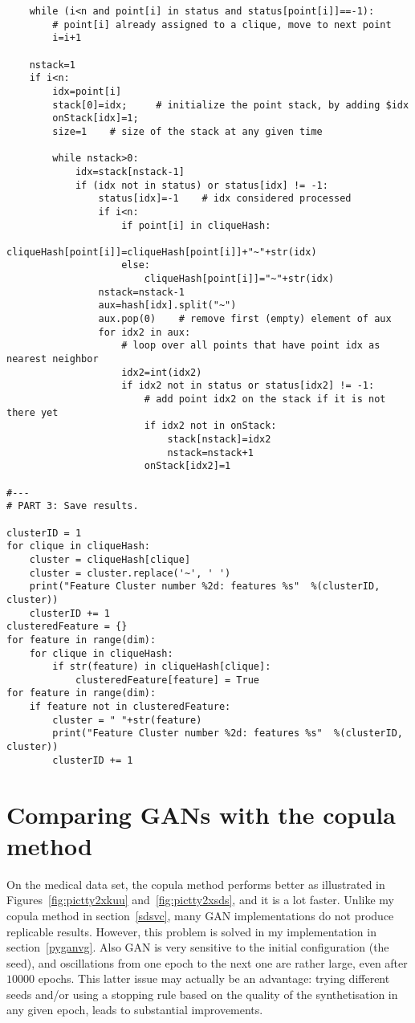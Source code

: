 \documentclass[oneside,10pt]{book}
\begin{document}
\begin{lstlisting}
    while (i<n and point[i] in status and status[point[i]]==-1):    
        # point[i] already assigned to a clique, move to next point
        i=i+1

    nstack=1
    if i<n:
        idx=point[i]
        stack[0]=idx;     # initialize the point stack, by adding $idx 
        onStack[idx]=1;
        size=1    # size of the stack at any given time

        while nstack>0:    
            idx=stack[nstack-1]
            if (idx not in status) or status[idx] != -1: 
                status[idx]=-1    # idx considered processed
                if i<n:    
                    if point[i] in cliqueHash:
                        cliqueHash[point[i]]=cliqueHash[point[i]]+"~"+str(idx)
                    else: 
                        cliqueHash[point[i]]="~"+str(idx)
                nstack=nstack-1 
                aux=hash[idx].split("~")
                aux.pop(0)    # remove first (empty) element of aux
                for idx2 in aux:
                    # loop over all points that have point idx as nearest neighbor
                    idx2=int(idx2)
                    if idx2 not in status or status[idx2] != -1:     
                        # add point idx2 on the stack if it is not there yet
                        if idx2 not in onStack: 
                            stack[nstack]=idx2
                            nstack=nstack+1
                        onStack[idx2]=1

#---
# PART 3: Save results.

clusterID = 1
for clique in cliqueHash:
    cluster = cliqueHash[clique] 
    cluster = cluster.replace('~', ' ')
    print("Feature Cluster number %2d: features %s"  %(clusterID, cluster))
    clusterID += 1
clusteredFeature = {}
for feature in range(dim):
    for clique in cliqueHash:
        if str(feature) in cliqueHash[clique]: 
            clusteredFeature[feature] = True
for feature in range(dim):
    if feature not in clusteredFeature:
        cluster = " "+str(feature)
        print("Feature Cluster number %2d: features %s"  %(clusterID, cluster))
        clusterID += 1        
\end{lstlisting}

\section{Comparing GANs with the copula method}

On the medical data set, the copula method performs better as illustrated
 in Figures~\ref{fig:pictty2xkuu} and~\ref{fig:pictty2xsds}, and it is a lot faster. Unlike my copula method
 in section~\ref{sdsvc}, many GAN implementations do not
 produce replicable results. However, this problem is solved in my implementation in section~\ref{pyganvg}. Also GAN is very sensitive to
 the initial configuration (the seed), and oscillations from one epoch to the next one are rather large, even after $\num{10000}$ epochs.
 This latter issue may actually be an advantage: trying different seeds and/or using a stopping rule based on the quality of the synthetisation
 in any given epoch, leads to substantial improvements. 
\end{document}
